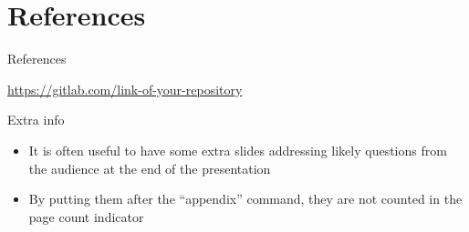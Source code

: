 \section{References}

\begin{frame}[allowframebreaks]{References}
  \nocite{bronevetsky02, schmidt03:MSc, FSF:GNU-GPL, CORBA:spec, MenaChalco08, natbib, biblatex, eco:09}
  \printbibliography
\end{frame}

\begin{frame}{\insertshorttitle}
  \overview

  {%
    \centering\noindent%
    \url{https://gitlab.com/link-of-your-repository}\par
  }

\end{frame}

\showqrcode

\appendix

\begin{frame}{Extra info}
  \begin{itemize}
    \item It is often useful to have some extra slides addressing likely questions from the audience at the end of the presentation
    \item By putting them after the ``appendix'' command, they are not counted in the page count indicator
  \end{itemize}
\end{frame}
